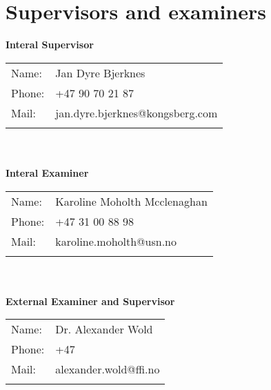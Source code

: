 \section{Supervisors and examiners}

\textbf{Interal Supervisor}\\
\begin{tabular}{ll}                                              
Name: 	            & Jan Dyre Bjerknes	         \\
Phone:		        & +47 90 70 21 87			     \\
Mail:	            & jan.dyre.bjerknes@kongsberg.com  \\\\      
\end{tabular}
\\\\
\textbf{Interal Examiner}\\
\begin{tabular}{ll}                                              
Name: 	            & Karoline Moholth Mcclenaghan   \\
Phone:		        & +47 31 00 88 98			     \\
Mail:	            & karoline.moholth@usn.no 	    \\\\      
\end{tabular}
\\\\
\textbf{External Examiner and Supervisor}\\
\begin{tabular}{ll}                                              
Name: 	            & Dr. Alexander Wold   \\
Phone:		        & +47 			     \\
Mail:	            & alexander.wold@ffi.no 	    \\\\      
\end{tabular}
\\\\

